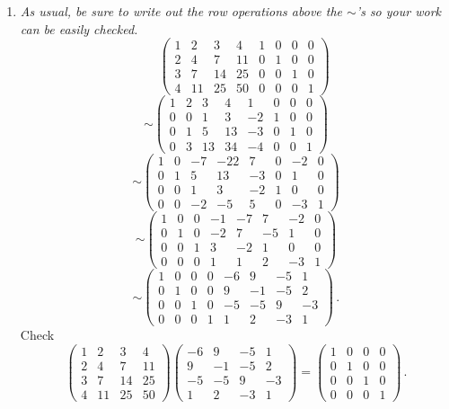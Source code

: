 \begin{enumerate}
\begin{enumerate}
\end{enumerate}

\item 
{\itshape As usual, be sure to write out the row operations above the $\sim$'s so your work can be easily checked.}
\[
\phantom{\sim}
\left(
\begin{array}{rrrr|rrrr}
1&2&3&4&1&0&0&0\\
2&4&7&11&0&1&0&0\\
3&7&14&25&0&0&1&0\\
4&11&25&50&0&0&0&1
\end{array}\right)
\]
\[
\sim
\left(
\begin{array}{rrrr|rrrr}
1&2&3&4&1&0&0&0\\
0&0&1&3&-2&1&0&0\\
0&1&5&13&-3&0&1&0\\
0&3&13&34&-4&0&0&1
\end{array}\right)
\]
\[
\sim
\left(
\begin{array}{rrrr|rrrr}
1&0&-7&-22&7&0&-2&0\\
0&1&5&13&-3&0&1&0\\
0&0&1&3&-2&1&0&0\\
0&0&-2&-5&5&0&-3&1
\end{array}\right)
\]
\[
\sim
\left(
\begin{array}{rrrr|rrrr}
1&0&0&-1&-7&7&-2&0\\
0&1&0&-2&7&-5&1&0\\
0&0&1&3&-2&1&0&0\\
0&0&0&1&1&2&-3&1
\end{array}\right)
\]
\[
\sim
\left(
\begin{array}{rrrr|rrrr}
1&0&0&0&-6&9&-5&1\\
0&1&0&0&9&-1&-5&2\\
0&0&1&0&-5&-5&9&-3\\
0&0&0&1&1&2&-3&1
\end{array}\right)\, .
\]
Check
\[
\begin{pmatrix}
1&2&3&4\\2&4&7&11\\3&7&14&25\\4&11&25&50
\end{pmatrix}
\begin{pmatrix}
-6&9&-5&1\\9&-1&-5&2\\-5&-5&9&-3\\1&2&-3&1
\end{pmatrix}
=
\begin{pmatrix}
1&0&0&0\\0&1&0&0\\0&0&1&0\\0&0&0&1
\end{pmatrix}\, .
\]


\end{enumerate}
